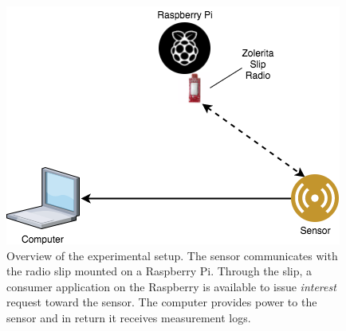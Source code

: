 \begin{figure}
	\includegraphics[width=\textwidth]{figures/experiment_setup.png}
	\caption{Overview of the experimental setup. The sensor communicates with the radio slip mounted on a Raspberry Pi. Through the slip, a consumer application on the Raspberry is available to issue \textit{interest} request toward the sensor. The computer provides power to the sensor and in return it receives measurement logs.}
	\label{fig:experiment_setup}
\end{figure}






